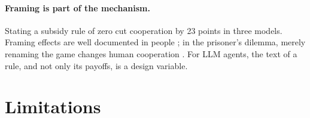 \documentclass[10pt]{article}
\theoremstyle{definition}
\theoremstyle{remark}
\begin{document}
\paragraph{Framing is part of the mechanism.} Stating a subsidy rule of zero cut cooperation by
23 points in three models. Framing effects are well documented in people \citep{tversky1981framing}; in the prisoner's
dilemma, merely renaming the game changes human cooperation \citep{liberman2004name}. For LLM
agents, the text of a rule, and not only its payoffs, is a design variable.

\section{Limitations}\label{sec:limitations}
\end{document}
